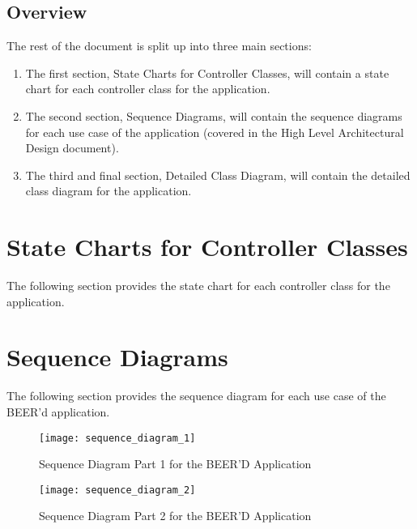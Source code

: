 \documentclass[]{article}
\begin{document}
\subsection{Overview}
\label{sub:overview}
The rest of the document is split up into three main sections:
\begin{enumerate}[-]
	\item The first section, State Charts for Controller Classes, will contain a state chart for each controller class for the application.
	\item The second section, Sequence Diagrams, will contain the sequence diagrams for each use case of the application (covered in the High Level Architectural Design document).
	\item The third and final section, Detailed Class Diagram, will contain the detailed class diagram for the application.
\end{enumerate}




\newpage
\section{State Charts for Controller Classes}
\label{sec:state_charts_for_controller_classes}
The following section provides the state chart for each controller class for the application.







\newpage
\section{Sequence Diagrams}
\label{sec:sequence_diagrams}
The following section provides the sequence diagram for each use case of the BEER'd application.
\begin{figure}[!htbp]
\texttt{[image: sequence\_diagram\_1]}
\caption{Sequence Diagram Part 1 for the BEER'D Application}
\end{figure}
\begin{figure}[!htbp]
\texttt{[image: sequence\_diagram\_2]}
\caption{Sequence Diagram Part 2 for the BEER'D Application}
\end{figure}
\end{document}

